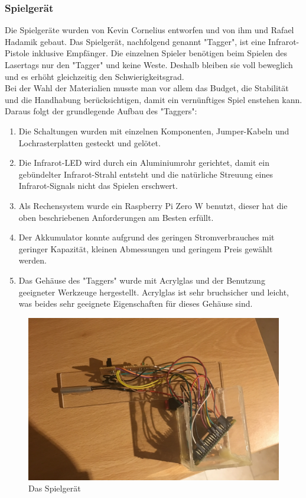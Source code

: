 \subsubsection{Spielgerät}

Die Spielgeräte wurden von Kevin Cornelius entworfen und von ihm und Rafael Hadamik gebaut.
Das Spielgerät, nachfolgend genannt "Tagger", ist eine Infrarot-Pistole inklusive Empfänger. Die einzelnen Spieler benötigen beim Spielen des Lasertags nur den "Tagger" und keine Weste. Deshalb bleiben sie voll beweglich und es erhöht gleichzeitig den Schwierigkeitsgrad. \\
Bei der Wahl der Materialien musste man vor allem das Budget, die Stabilität und die Handhabung berücksichtigen, damit ein vernünftiges Spiel enstehen kann. Daraus folgt der grundlegende Aufbau des "Taggers":
\begin{enumerate}
	\item Die Schaltungen wurden mit einzelnen Komponenten, Jumper-Kabeln und Lochrasterplatten gesteckt und gelötet.
	\item Die Infrarot-LED wird durch ein Aluminiumrohr gerichtet, damit ein gebündelter Infrarot-Strahl entsteht und die natürliche Streuung eines Infrarot-Signals nicht das Spielen erschwert.
	\item Als Rechensystem wurde ein Raspberry Pi Zero W benutzt, dieser  hat die oben beschriebenen Anforderungen am Besten erfüllt.
	\item Der Akkumulator konnte aufgrund des geringen Stromverbrauches mit geringer Kapazität, kleinen Abmessungen und geringem Preis gewählt werden.
	\item Das Gehäuse des "Taggers" wurde mit Acrylglas und der Benutzung geeigneter Werkzeuge hergestellt. Acrylglas ist sehr bruchsicher und leicht, was beides sehr geeignete Eigenschaften für dieses Gehäuse sind.
\end{enumerate}
\begin{figure}[ht]
	\centering
		\includegraphics[width=0.7 \textwidth]{./040-komponenten/010-hardware/tagger.jpg}
	\caption{Das Spielgerät}
	\label{fig:Bild1Hardware}
\end{figure}

